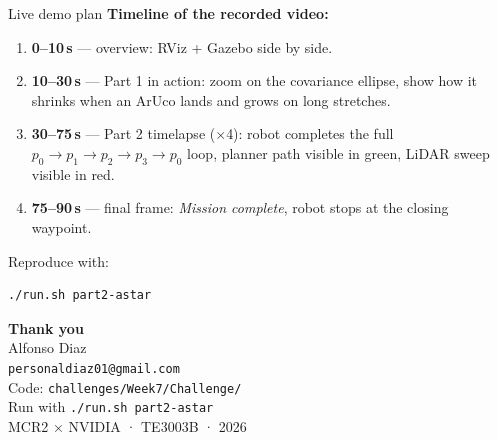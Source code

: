 \documentclass[10pt,aspectratio=169]{beamer}
\begin{document}
\begin{frame}[fragile]{Live demo plan}
  \small
  \textbf{Timeline of the recorded video:}
  \begin{enumerate}
    \item \textbf{0–10\,s} — overview: RViz + Gazebo side by side.
    \item \textbf{10–30\,s} — Part 1 in action: zoom on the covariance ellipse,
          show how it shrinks when an ArUco lands and grows on long stretches.
    \item \textbf{30–75\,s} — Part 2 timelapse ($\times$4): robot completes the
          full $p_0 \to p_1 \to p_2 \to p_3 \to p_0$ loop, planner path
          visible in green, LiDAR sweep visible in red.
    \item \textbf{75–90\,s} — final frame: \emph{Mission complete}, robot
          stops at the closing waypoint.
  \end{enumerate}

  \medskip
  Reproduce with:
  \begin{lstlisting}[language=bash,basicstyle=\ttfamily\scriptsize]
./run.sh part2-astar
  \end{lstlisting}
\end{frame}

\begin{frame}
  \vfill
  \centering
  {\Huge\bfseries Thank you}\\[1em]
  {\large Alfonso Diaz}\\[0.3em]
  \texttt{personaldiaz01@gmail.com}\\[2em]
  \footnotesize
  Code: \texttt{challenges/Week7/Challenge/}\\
  Run with \texttt{./run.sh part2-astar}\\[1em]
  \textcolor{black!50}{MCR2 × NVIDIA · TE3003B · 2026}
  \vfill
\end{frame}
\end{document}

